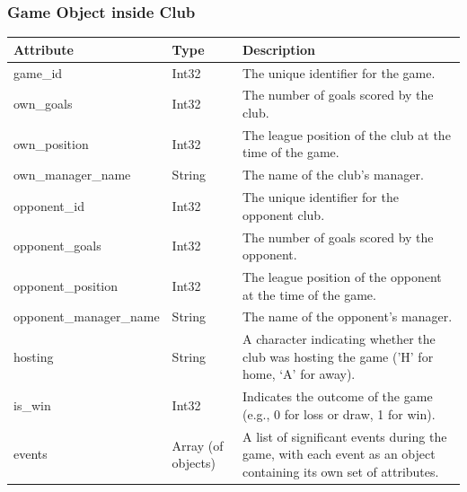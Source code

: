 \documentclass{Configuration_Files/PoliMi3i_thesis}
\begin{document}
\subsubsection{Game Object inside Club}
    \begin{tabular}{|l|l|p{8cm}|}
    \hline
    \rowcolor{bluepoli!40}
    \textbf{Attribute}            & \textbf{Type}           & \textbf{Description}                                                                                  \\ \hline
    game\_id                      & Int32                   & The unique identifier for the game.                                                                   \\ \hline
    own\_goals                    & Int32                   & The number of goals scored by the club.                                                               \\ \hline
    own\_position                 & Int32                   & The league position of the club at the time of the game.                                              \\ \hline
    own\_manager\_name            & String                  & The name of the club's manager.                                                                       \\ \hline
    opponent\_id                  & Int32                   & The unique identifier for the opponent club.                                                          \\ \hline
    opponent\_goals               & Int32                   & The number of goals scored by the opponent.                                                           \\ \hline
    opponent\_position            & Int32                   & The league position of the opponent at the time of the game.                                          \\ \hline
    opponent\_manager\_name       & String                  & The name of the opponent's manager.                                                                   \\ \hline
    hosting                       & String                  & A character indicating whether the club was hosting the game ('H' for home, ‘A’ for away).             \\ \hline
    is\_win                       & Int32                   & Indicates the outcome of the game (e.g., 0 for loss or draw, 1 for win).                              \\ \hline
    events                        & Array (of objects)      & A list of significant events during the game, with each event as an object containing its own set of attributes. \\ \hline
    \end{tabular}
\end{document}
